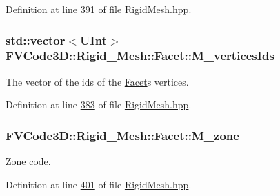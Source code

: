 Definition at line \hyperlink{RigidMesh_8hpp_source_l00391}{391} of file \hyperlink{RigidMesh_8hpp_source}{Rigid\+Mesh.\+hpp}.

\subsubsection[{\texorpdfstring{M\+\_\+vertices\+Ids}{M_verticesIds}}]{\setlength{\rightskip}{0pt plus 5cm}std\+::vector$<${\bf U\+Int}$>$ F\+V\+Code3\+D\+::\+Rigid\+\_\+\+Mesh\+::\+Facet\+::\+M\+\_\+vertices\+Ids\hspace{0.3cm}{\ttfamily [protected]}}\hypertarget{classFVCode3D_1_1Rigid__Mesh_1_1Facet_a4db7298b2b4607ec53de41887df9a025}{}\label{classFVCode3D_1_1Rigid__Mesh_1_1Facet_a4db7298b2b4607ec53de41887df9a025}


The vector of the ids of the \hyperlink{classFVCode3D_1_1Rigid__Mesh_1_1Facet}{Facet}\textquotesingle{}s vertices. 



Definition at line \hyperlink{RigidMesh_8hpp_source_l00383}{383} of file \hyperlink{RigidMesh_8hpp_source}{Rigid\+Mesh.\+hpp}.

\subsubsection[{\texorpdfstring{M\+\_\+zone}{M_zone}}]{ F\+V\+Code3\+D\+::\+Rigid\+\_\+\+Mesh\+::\+Facet\+::\+M\+\_\+zone\hspace{0.3cm}{\ttfamily [protected]}}\hypertarget{classFVCode3D_1_1Rigid__Mesh_1_1Facet_a7178163032acb89539c28bc154f1a613}{}\label{classFVCode3D_1_1Rigid__Mesh_1_1Facet_a7178163032acb89539c28bc154f1a613}


Zone code. 



Definition at line \hyperlink{RigidMesh_8hpp_source_l00401}{401} of file \hyperlink{RigidMesh_8hpp_source}{Rigid\+Mesh.\+hpp}.

